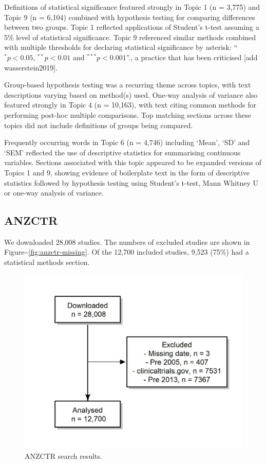 \documentclass[12pt]{article}
\begin{document}
Definitions of statistical significance featured strongly in Topic 1 (n
= 3,775) and Topic 9 (n = 6,104) combined with hypothesis testing for
comparing differences between two groups. Topic 1 reflected applications
of Student's t-test assuming a 5\% level of statistical significance.
Topic 9 referenced similar methods combined with multiple thresholds for
declaring statistical significance by asterisk: ``\(^{*}p<0.05\),
\(^{**}p<0.01\) and \(^{***}p<0.001\)''., a practice that has been
criticised {[}add wasserstein2019{]}.

Group-based hypothesis testing was a recurring theme across topics, with
text descriptions varying based on method(s) used. One-way analysis of
variance also featured strongly in Topic 4 (n = 10,163), with text
citing common methods for performing post-hoc multiple comparisons. Top
matching sections across these topics did not include definitions of
groups being compared.

Frequently occurring words in Topic 6 (n = 4,746) including `Mean', `SD'
and `SEM' reflected the use of descriptive statistics for summarising
continuous variables. Sections associated with this topic appeared to be
expanded versions of Topics 1 and 9, showing evidence of boilerplate
text in the form of descriptive statistics followed by hypothesis
testing using Student's t-test, Mann Whitney U or one-way analysis of
variance.

\subsection{ANZCTR}

We downloaded 28,008 studies. The numbers of excluded studies are shown
in Figure\textasciitilde{}\ref{fig:anzctr-missing}. Of the 12,700
included studies, 9,523 (75\%) had a statistical methods section.

\begin{figure}

{\centering \includegraphics[width=0.7\linewidth]{figures/excluded_anzctr_missing} 

}

\caption{ANZCTR search results.}\label{fig:unnamed-chunk-8}
\end{figure}
\end{document}
